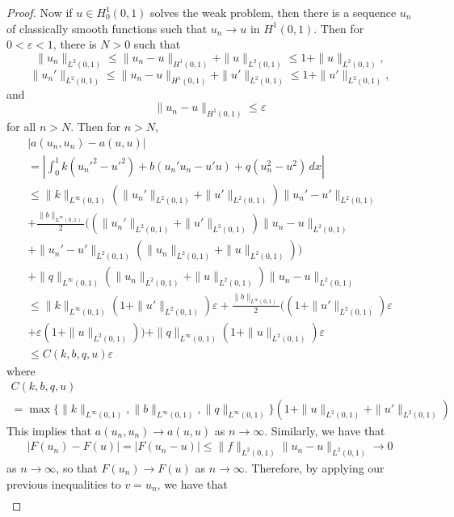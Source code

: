 \documentclass{article}
\begin{document}
\begin{enumerate}
\begin{proof}
		      Now if $u \in H_0^1(0,1)$ solves the weak problem, then there is a sequence $u_n$ of classically smooth functions such that $u_n \to u$ in $H^1(0,1)$.
		      Then for $0 < \varepsilon < 1$, there is $N > 0$ such that \[\|u_n\|_{L^2(0,1)} \leq \|u_n - u\|_{H^1(0,1)} + \|u\|_{L^2(0,1)} \leq 1 + \|u\|_{L^2(0,1)},\] \[\|u_n'\|_{L^2(0,1)} \leq \|u_n - u\|_{H^1(0,1)} + \|u'\|_{L^2(0,1)} \leq 1 + \|u'\|_{L^2(0,1)},\] and \[\|u_n - u\|_{H^1(0,1)} \leq \varepsilon\]
		      for all $n > N$.
		      Then for $n > N$,
		      \begin{multline*}
			      |a(u_n,u_n) - a(u,u)| \\ = \left|\int_0^1 k(u_n'^2 - u'^2) + b(u_n'u_n - u'u) + q(u_n^2-u^2)\,dx\right| \\
			      \leq \|k\|_{L^\infty(0,1)}(\|u_n'\|_{L^2(0,1)} + \|u'\|_{L^2(0,1)})\|u_n'-u'\|_{L^2(0,1)} \\
			      + \frac{\|b\|_{L^\infty(0,1)}}{2}\big((\|u_n'\|_{L^2(0,1)} + \|u'\|_{L^2(0,1)})\|u_n-u\|_{L^2(0,1)} \\
			      + \|u_n'-u'\|_{L^2(0,1)}(\|u_n\|_{L^2(0,1)}+\|u\|_{L^2(0,1)})\big) \\
			      + \|q\|_{L^\infty(0,1)}(\|u_n\|_{L^2(0,1)} + \|u\|_{L^2(0,1)})\|u_n-u\|_{L^2(0,1)} \\
			      \leq \|k\|_{L^\infty(0,1)}(1 + \|u'\|_{L^2(0,1)})\varepsilon + \frac{\|b\|_{L^\infty(0,1)}}{2}\big((1 + \|u'\|_{L^2(0,1)})\varepsilon \\
			      + \varepsilon(1+\|u\|_{L^2(0,1)})\big) + \|q\|_{L^\infty(0,1)}(1 + \|u\|_{L^2(0,1)})\varepsilon \\
			      \leq C(k,b,q,u)\varepsilon
		      \end{multline*}
		      where
		      \begin{multline*}
			      C(k,b,q,u) \\ = \max\{\|k\|_{L^\infty(0,1)},\|b\|_{L^\infty(0,1)},\|q\|_{L^\infty(0,1)}\}(1 + \|u\|_{L^2(0,1)} + \|u'\|_{L^2(0,1)})
		      \end{multline*}
		      This implies that $a(u_n,u_n) \to a(u,u)$ as $n \to \infty$.
		      Similarly, we have that
		      \begin{align*}
			      |F(u_n) - F(u)| = |F(u_n - u)| \leq \|f\|_{L^2(0,1)}\|u_n-u\|_{L^2(0,1)} \to 0
		      \end{align*}
		      as $n \to \infty$, so that $F(u_n) \to F(u)$ as $n \to \infty$.
		      Therefore, by applying our previous inequalities to $v = u_n$, we have that
		      \begin{align*}

\end{align*}
\end{proof}
\end{enumerate}
\end{document}
